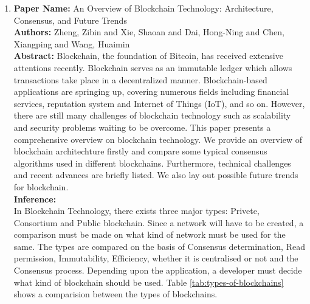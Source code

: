 \documentclass[oneside, 12pt]{book}
\begin{document}
\begin{enumerate}
\begin{itemize}
					\end{itemize}
				\item
					\textbf{Paper Name:} An Overview of Blockchain Technology: Architecture, Consensus, and Future Trends \cite{zheng2017overview}\\
					\textbf{Authors:} Zheng, Zibin and Xie, Shaoan and Dai, Hong-Ning and Chen, Xiangping and Wang, Huaimin\\
					\textbf{Abstract:} Blockchain, the foundation of Bitcoin, has received extensive attentions recently. Blockchain serves as an immutable ledger which allows transactions take place in a decentralized manner. Blockchain-based applications are springing up, covering numerous fields including financial services, reputation system and Internet of Things (IoT), and so on. However, there are still many challenges of blockchain technology such as scalability and security problems waiting to be overcome. This paper presents a comprehensive overview on blockchain technology. We provide an overview of blockchain architechture firstly and compare some typical consensus algorithms used in different blockchains. Furthermore, technical challenges and recent advances are briefly listed. We also lay out possible future trends for blockchain.\\
					\textbf{Inference:}
					\\In Blockchain Technology, there exists three major types: Privete, Consortium and Public blockchain. Since a network will have to be created, a comparison must be made on what kind of network must be used for the same. The types are compared on the basis of Consensus determination, Read permission, Immutability, Efficiency, whether it is centralised or not and the Consensus process. Depending upon the application, a developer must decide what kind of blockchain should be used. Table \ref{tab:types-of-blockchains} shows a comparision between the types of blockchains.
					\begin{table}[H]
						\centering
\end{table}
\end{enumerate}
\end{document}
